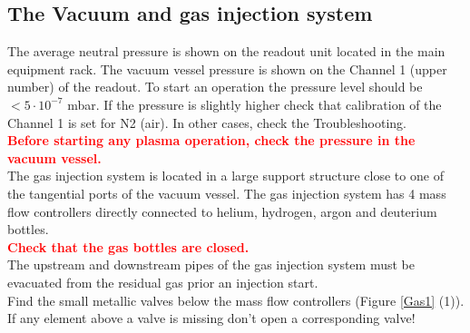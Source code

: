 \documentclass[fleqn,a4paper,20pt]{article}
\begin{document}
\begin{minipage}{.68\textwidth}
	
\subsection{The Vacuum and gas injection system}

The average neutral pressure is shown on the readout unit located in the main equipment rack.	The vacuum vessel pressure is shown on the Channel 1 (upper number) of the readout. To start an operation the pressure level should be $< 5\cdot 10^{-7}$ mbar. If the pressure is slightly higher check that calibration of the Channel 1 is set for N2 (air). In other cases, check the Troubleshooting.\\

\textcolor{red}{\textbf{Before starting any plasma operation, check the pressure in the vacuum vessel.}}\\

The gas injection system is located in a large support structure close to one of the tangential ports of the vacuum vessel. The gas injection system has 4 mass flow controllers directly connected to helium, hydrogen, argon and deuterium bottles.\\

\textcolor{red}{\textbf{Check that the gas bottles are closed.}}\\

The upstream and downstream pipes of the gas injection system must be evacuated from the residual gas prior an injection start.\\

Find the small metallic valves below the mass flow controllers (Figure \ref{Gas1} (1)). If any element above a valve is missing don’t open a corresponding valve! \\

\end{minipage}
\begin{minipage}{.02\textwidth}
	$\ $\\
\end{minipage}
\end{document}

